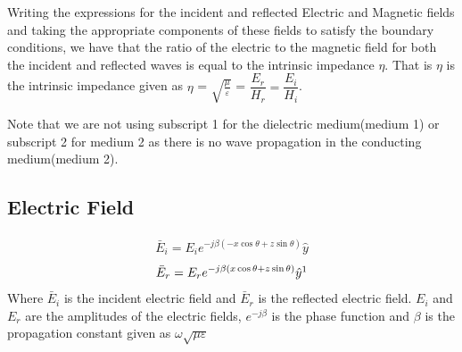 Writing the expressions for the incident and reflected Electric and Magnetic fields and taking the appropriate components of these fields to satisfy the boundary conditions, we have that the ratio of the electric to the magnetic field for both the incident and reflected waves is equal to the intrinsic impedance $\eta $. That is $ \eta $ is the intrinsic impedance given as $\eta $ = $\sqrt{\frac{\mu}{\varepsilon}}$ = $\dfrac{E_r}{H_r} = \dfrac{E_i}{H_i}$.

Note that we are not using subscript 1 for the dielectric medium(medium 1) or subscript 2 for medium 2 as there is no wave propagation in the conducting medium(medium 2).

\subsection{Electric Field}
\begin{align}
\bar{E}_i = E_i e^{-j\beta(-x\cos\theta + z\sin\theta)} \hat{y}
\label{eqn:elecincid}
\end{align}
\begin{align}
\bar{E}_r =E_r  e^{-j\beta ( x\cos\theta + z\sin\theta)} \hat{y}\footnotemark
\label{eqn:elecref}
\end{align}
Where $\bar{E}_i$ is the incident electric field and $\bar{E}_r$ is the reflected electric field. $E_i$ and $E_r$ are the amplitudes of the electric fields, $e^{-j\beta}$ is the phase function and $\beta$ is the propagation constant given as $\omega \sqrt{\mu\varepsilon}$ 

